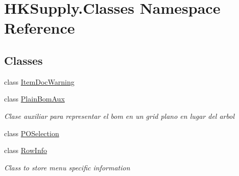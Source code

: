 \hypertarget{namespace_h_k_supply_1_1_classes}{}\section{H\+K\+Supply.\+Classes Namespace Reference}
\label{namespace_h_k_supply_1_1_classes}
\subsection*{Classes}
\begin{DoxyCompactItemize}
\item 
class \mbox{\hyperlink{class_h_k_supply_1_1_classes_1_1_item_doc_warning}{Item\+Doc\+Warning}}
\item 
class \mbox{\hyperlink{class_h_k_supply_1_1_classes_1_1_plain_bom_aux}{Plain\+Bom\+Aux}}
\begin{DoxyCompactList}\small\item\em Clase auxiliar para representar el bom en un grid plano en lugar del arbol \end{DoxyCompactList}\item 
class \mbox{\hyperlink{class_h_k_supply_1_1_classes_1_1_p_o_selection}{P\+O\+Selection}}
\item 
class \mbox{\hyperlink{class_h_k_supply_1_1_classes_1_1_row_info}{Row\+Info}}
\begin{DoxyCompactList}\small\item\em Class to store menu specific information \end{DoxyCompactList}\end{DoxyCompactItemize}
